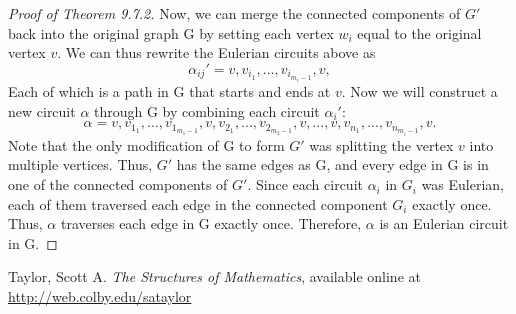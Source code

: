 \begin{proof}[Proof of Theorem 9.7.2]
    Now, we can merge the connected components of $G'$ back into the original graph G by setting each vertex $w_i$ equal to the original vertex $v$. We can thus rewrite the Eulerian circuits above as
    \[
    \alpha_{ij}'=v, v_{i_1},...,v_{i_{m_i-1}}, v,
    \]
    Each of which is a path in G that starts and ends at $v$. Now we will construct a new circuit $\alpha$ through G by combining each circuit $\alpha_i'$:
    \[
    \alpha=v, v_{1_1},...,v_{1_{m_1-1}}, v, v_{2_1},...,v_{2_{m_2-1}}, v,...,v, v_{n_1},...,v_{n_{m_i-1}}, v.
    \]
    Note that the only modification of G to form $G'$ was splitting the vertex $v$ into multiple vertices. Thus, $G'$ has the same edges as G, and every edge in G is in one of the connected components of $G'$. Since each circuit $\alpha_i$ in $G_i$ was Eulerian, each of them traversed each edge in the connected component $G_i$ exactly once. Thus, $\alpha$ traverses each edge in G exactly once. Therefore, $\alpha$ is an Eulerian circuit in G. 
    \end{proof}
    
	
	\begin{thebibliography}{99}
	  Taylor, Scott A. \emph{The Structures of Mathematics}, available online at \url{http://web.colby.edu/sataylor}

	
	\end{thebibliography}
	

